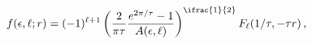 \[\mathop{f\/}\nolimits\!\left(\epsilon,\ell;r\right)=(-1)^{\ell+1}\left(\frac{2%
}{\pi\tau}\frac{e^{2\pi/\tau}-1}{A(\epsilon,\ell)}\right)^{\ifrac{1}{2}}%
\mathop{F_{\ell}\/}\nolimits\!\left(1/\tau,-\tau r\right),\]